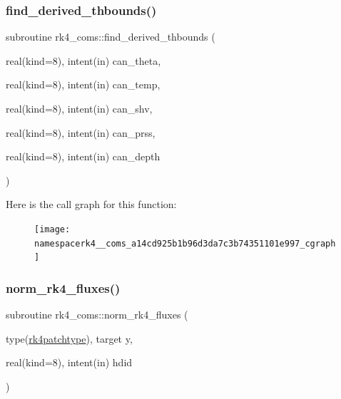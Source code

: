 \subsubsection{\texorpdfstring{find\+\_\+derived\+\_\+thbounds()}{find\_derived\_thbounds()}}
{\footnotesize\ttfamily subroutine rk4\+\_\+coms\+::find\+\_\+derived\+\_\+thbounds (\begin{DoxyParamCaption}\item[{real(kind=8), intent(in)}]{can\+\_\+theta,  }\item[{real(kind=8), intent(in)}]{can\+\_\+temp,  }\item[{real(kind=8), intent(in)}]{can\+\_\+shv,  }\item[{real(kind=8), intent(in)}]{can\+\_\+prss,  }\item[{real(kind=8), intent(in)}]{can\+\_\+depth }\end{DoxyParamCaption})}

Here is the call graph for this function\+:
\nopagebreak
\begin{figure}[H]
\begin{center}
\leavevmode
\texttt{[image: namespacerk4\_\_coms\_a14cd925b1b96d3da7c3b74351101e997\_cgraph]}
\end{center}
\end{figure}
\mbox{\label{namespacerk4__coms_ad9cf07917e6000f8f46e84428647b494}} 
\subsubsection{\texorpdfstring{norm\+\_\+rk4\+\_\+fluxes()}{norm\_rk4\_fluxes()}}
{\footnotesize\ttfamily subroutine rk4\+\_\+coms\+::norm\+\_\+rk4\+\_\+fluxes (\begin{DoxyParamCaption}\item[{type(\hyperlink{structrk4__coms_1_1rk4patchtype}{rk4patchtype}), target}]{y,  }\item[{real(kind=8), intent(in)}]{hdid }\end{DoxyParamCaption})}

\mbox{\label{namespacerk4__coms_a306ba21ba388b2e51767aa9f5d76eda0}} 

